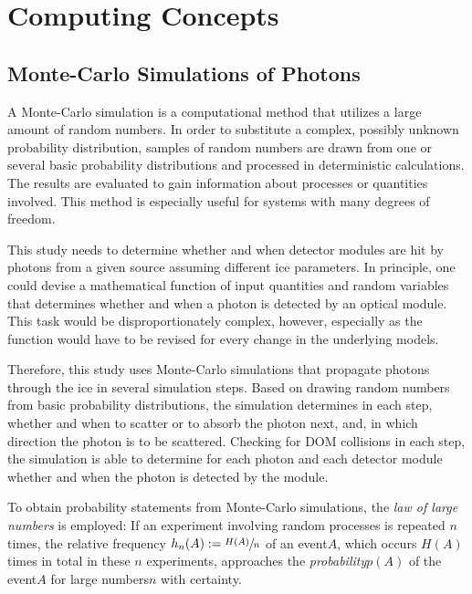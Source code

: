 
\section{Computing Concepts}
\label{sec:simulation_background}

\subsection{Monte-Carlo Simulations of Photons}
\label{sec:monte_carlo}


A Monte-Carlo simulation is a computational method that utilizes a large amount of random numbers.
In order to substitute a complex, possibly unknown probability distribution, samples of random numbers are drawn from one or several basic probability distributions and processed in deterministic calculations. The results are evaluated to gain information about processes or quantities involved. This method is especially useful for systems with many degrees of freedom. \cite{physiklexikon}

This study needs to determine whether and when detector modules are hit by photons from a given source assuming different ice parameters. In principle, one could devise a mathematical function of input quantities and random variables that determines whether and when a photon is detected by an optical module. This task would be disproportionately complex, however, especially as the function would have to be revised for every change in the underlying models.

Therefore, this study uses Monte-Carlo simulations that propagate photons through the ice in several simulation steps. Based on drawing random numbers from basic probability distributions, the simulation determines in each step, whether and when to scatter or to absorb the photon next, and, in which direction the photon is to be scattered. Checking for DOM collisions in each step, the simulation is able to determine for each photon and each detector module whether and when the photon is detected by the module.

To obtain probability statements from Monte-Carlo simulations, the \textit{law of large numbers} is employed: If an experiment involving random processes is repeated $n$ times, the relative frequency $h_n(A):=\sfrac{H(A)}{n}$ of an event\nbsp $A$, which occurs $H(A)$ times in total in these $n$ experiments, approaches the \textit{probability}\nbsp $p(A)$ of the event\nbsp $A$ for large numbers\nbsp $n$ with certainty. \cite{physiklexikon}

